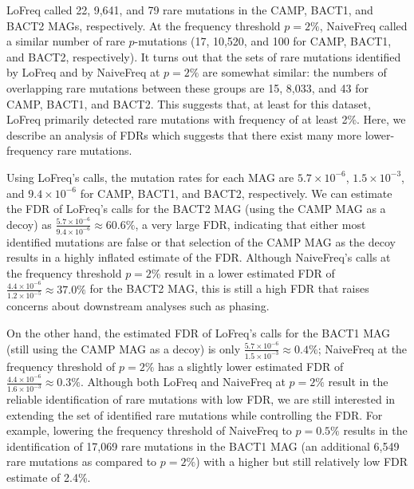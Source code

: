 LoFreq called 22, 9,641, and 79 rare mutations in the CAMP, BACT1, and BACT2 MAGs, respectively. At the frequency threshold $p = 2\%$, NaiveFreq called a similar number of rare $p$-mutations (17, 10,520, and 100 for CAMP, BACT1, and BACT2, respectively). It turns out that the sets of rare mutations identified by LoFreq and by NaiveFreq at $p = 2\%$ are somewhat similar: the numbers of overlapping rare mutations between these groups are 15, 8,033, and 43 for CAMP, BACT1, and BACT2. This suggests that, at least for this dataset, LoFreq primarily detected rare mutations with frequency of at least 2\%. Here, we describe an analysis of FDRs which suggests that there exist many more lower-frequency rare mutations.

Using LoFreq's calls, the mutation rates for each MAG are $5.7 \times 10^{-6}$, $1.5 \times 10^{-3}$, and $9.4 \times 10^{-6}$ for CAMP, BACT1, and BACT2, respectively. We can estimate the FDR of LoFreq's calls for the BACT2 MAG (using the CAMP MAG as a decoy) as $\frac{5.7 \times 10^{-6}}{9.4 \times 10^{-6}} \approx 60.6\%$, a very large FDR, indicating that either most identified mutations are false or that selection of the CAMP MAG as the decoy results in a highly inflated estimate of the FDR. Although NaiveFreq's calls at the frequency threshold $p = 2\%$ result in a lower estimated FDR of $\frac{4.4 \times 10^{-6}}{1.2 \times 10^{-5}} \approx 37.0\%$ for the BACT2 MAG, this is still a high FDR that raises concerns about downstream analyses such as phasing.

On the other hand, the estimated FDR of LoFreq's calls for the BACT1 MAG (still using the CAMP MAG as a decoy) is only $\frac{5.7 \times 10^{-6}}{1.5 \times 10^{-3}} \approx 0.4\%$; NaiveFreq at the frequency threshold of $p = 2\%$ has a slightly lower estimated FDR of $\frac{4.4 \times 10^{-6}}{1.6 \times 10^{-3}} \approx 0.3\%$. Although both LoFreq and NaiveFreq at $p = 2\%$ result in the reliable identification of rare mutations with low FDR, we are still interested in extending the set of identified rare mutations while controlling the FDR. For example, lowering the frequency threshold of NaiveFreq to $p = 0.5\%$ results in the identification of 17,069 rare mutations in the BACT1 MAG (an additional 6,549 rare mutations as compared to $p = 2\%$) with a higher but still relatively low FDR estimate of 2.4\%.\endinput